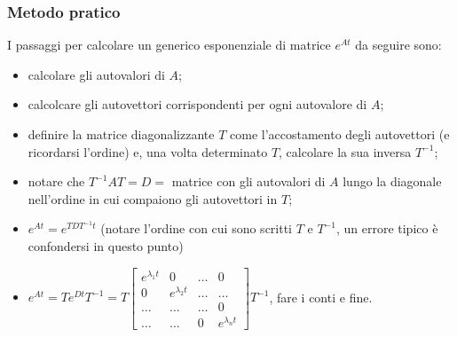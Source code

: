 \subsubsection{Metodo pratico}
I passaggi per calcolare un generico esponenziale di matrice $e^{At}$ da seguire sono:
\begin{itemize}
    \item calcolare gli autovalori di $A$;
    \item calcolcare gli autovettori corrispondenti per ogni autovalore di $A$;
    \item definire la matrice diagonalizzante $T$ come l'accostamento degli autovettori (e ricordarsi l'ordine) e, una volta determinato $T$, calcolare la sua inversa $T^{-1}$;
    \item notare che $T^{-1} A T = D =$ matrice con gli autovalori di $A$ lungo la diagonale nell'ordine in cui compaiono gli autovettori in $T$;
    \item $e^{At}= e^{T D T^{-1} t}$ (notare l'ordine con cui sono scritti $T$ e $T^{-1}$, un errore tipico è confondersi in questo punto)
    \item $e^{At} = T e^{D t} T^{-1} = T \left[\begin{matrix}
        e^{\lambda_1 t} & 0 & \dots & 0\\
        0 & e^{\lambda_2 t} & \dots & \dots\\
        \dots & \dots & \dots & 0\\
        \dots & \dots & 0 & e^{\lambda_n t}
    \end{matrix}\right] T^{-1}$, fare i conti e fine.
\end{itemize}